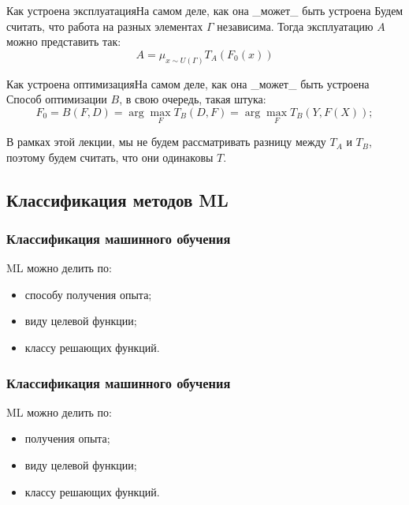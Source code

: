 \documentclass[14pt, fleqn, xcolor={dvipsnames, table}]{beamer}
\begin{document}
\begin{frame}{Как устроена эксплуатация}{На самом деле, как она \_может\_ быть устроена}
Будем считать, что работа на разных элементах $\Gamma$ независима. Тогда эксплуатацию $A$ можно представить так:
$$
A=\mu_{x \sim U(\Gamma)} T_A(F_0(x))
$$
\end{frame}

\begin{frame}{Как устроена оптимизация}{На самом деле, как она \_может\_ быть устроена}
Способ оптимизации $B$, в свою очередь, такая штука:
$$
F_0 = B(F, D) = \arg \max_{F} T_B(D, F) = \arg \max_{F} T_B(Y,F(X));
$$

В рамках этой лекции, мы не будем рассматривать разницу между $T_A$ и $T_B$, поэтому будем считать, что они одинаковы $T$.
\end{frame}

\subsection{Классификация методов ML}
\begin{frame}
\frametitle{Классификация машинного обучения}
ML можно делить по:
\begin{itemize}
	\item способу получения опыта;
	\item виду целевой функции;
	\item классу решающих функций.
\end{itemize}
\end{frame}

\begin{frame}
\frametitle{Классификация машинного обучения}
ML можно делить по:
\begin{itemize}
	\item { получения опыта;}
	\item виду целевой функции;
	\item классу решающих функций.
\end{itemize}
\end{frame}
\end{document}
